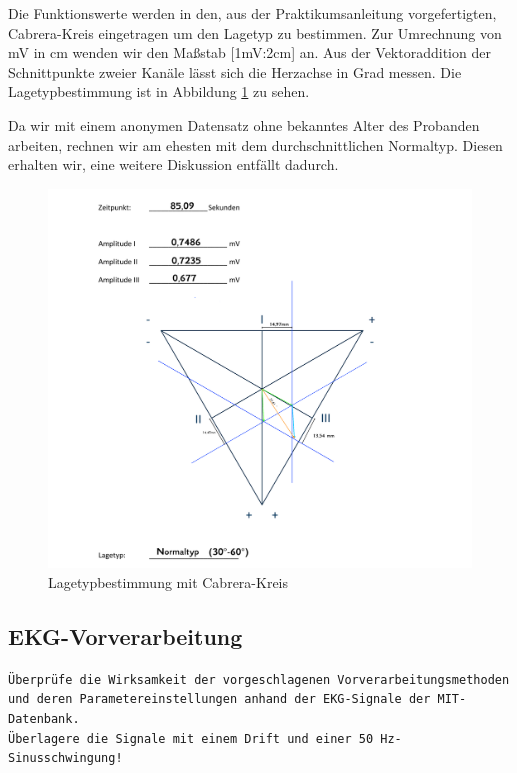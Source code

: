 \documentclass[a4paper,12pt,titlepage]{scrartcl}
\begin{document}
Die Funktionswerte werden in den, aus der Praktikumsanleitung vorgefertigten, Cabrera-Kreis eingetragen um den Lagetyp zu bestimmen.
Zur Umrechnung von mV in cm wenden wir den Maßstab [1mV:2cm] an. Aus der Vektoraddition der Schnittpunkte zweier Kanäle lässt sich die Herzachse in Grad messen.
Die Lagetypbestimmung ist in Abbildung \ref{Lagetypbestimmung} zu sehen.

Da wir mit einem anonymen Datensatz ohne bekanntes Alter des Probanden arbeiten, rechnen wir am ehesten mit dem durchschnittlichen Normaltyp. Diesen erhalten wir, eine weitere Diskussion entfällt dadurch.

\begin{figure}[h]
    \caption{Lagetypbestimmung mit Cabrera-Kreis}
    \label{Lagetypbestimmung}
    \centering
    \includegraphics[width=\linewidth]{Assets/LaborBMT-Lagetyps.png}
\end{figure}


\cleardoublepage
\subsection{EKG-Vorverarbeitung}\label{EKG-Vorverarbeitung}
\texttt{Überprüfe die Wirksamkeit der vorgeschlagenen Vorverarbeitungsmethoden und deren Parametereinstellungen anhand der EKG-Signale der MIT-Datenbank.\\ Überlagere die Signale mit einem Drift und einer 50 Hz-Sinusschwingung!}
\end{document}
